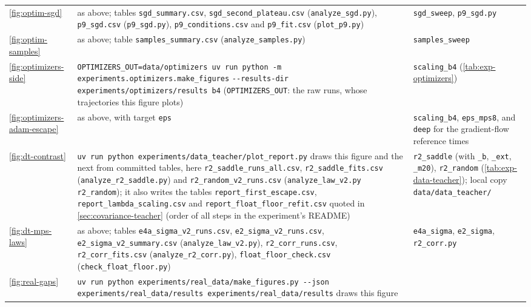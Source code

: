 \begin{xltabular}{\textwidth}{@{}l>{\raggedright\arraybackslash}p{6.4cm}>{\raggedright\arraybackslash}X@{}}
    \ref{fig:optim-sgd} & as above; tables \texttt{sgd\_summary.csv}, \texttt{sgd\_second\_plateau.csv}
      (\texttt{analyze\_sgd.py}), \texttt{p9\_sgd.csv} (\texttt{p9\_sgd.py}), \texttt{p9\_conditions.csv} and
      \texttt{p9\_fit.csv} (\texttt{plot\_p9.py})
      & \texttt{sgd\_sweep}, \texttt{p9\_sgd.py} \\
    \ref{fig:optim-samples} & as above; table \texttt{samples\_summary.csv} (\texttt{analyze\_samples.py})
      & \texttt{samples\_sweep} \\
    \ref{fig:optimizers-side} & \texttt{OPTIMIZERS\_OUT=data/optimizers uv run python -m
      experiments.optimizers.make\_figures} \texttt{-{}-results-dir experiments/optimizers/results b4}
      (\texttt{OPTIMIZERS\_OUT}: the raw runs, whose trajectories this figure plots) & \texttt{scaling\_b4}
      (\cref{tab:exp-optimizers}) \\
    \ref{fig:optimizers-adam-escape} & as above, with target \texttt{eps} & \texttt{scaling\_b4},
      \texttt{eps\_mps8}, and \texttt{deep} for the gradient-flow reference times \\
    \ref{fig:dt-contrast} & \texttt{uv run python experiments/data\_teacher/\allowbreak plot\_report.py} draws
      this figure and the next from committed tables, here \texttt{r2\_saddle\_runs\_all.csv},
      \texttt{r2\_saddle\_fits.csv} (\texttt{analyze\_r2\_saddle.py}) and \texttt{r2\_random\_v2\_runs.csv}
      (\texttt{analyze\_law\_v2.py r2\_random}); it also writes the tables \texttt{report\_first\_escape.csv},
      \texttt{report\_lambda\_scaling.csv} and \texttt{report\_float\_floor\_refit.csv} quoted in
      \cref{sec:covariance-teacher} (order of all steps in the experiment's README)
      & \texttt{r2\_saddle} (with \texttt{\_b}, \texttt{\_ext}, \texttt{\_m20}), \texttt{r2\_random}
      (\cref{tab:exp-data-teacher}); local copy \texttt{data/data\_teacher/} \\
    \ref{fig:dt-mps-laws} & as above; tables \texttt{e4a\_sigma\_v2\_runs.csv}, \texttt{e2\_sigma\_v2\_runs.csv},
      \texttt{e2\_sigma\_v2\_summary.csv} (\texttt{analyze\_law\_v2.py}), \texttt{r2\_corr\_runs.csv},
      \texttt{r2\_corr\_fits.csv} (\texttt{analyze\_r2\_corr.py}), \texttt{float\_floor\_check.csv}
      (\texttt{check\_float\_floor.py})
      & \texttt{e4a\_sigma}, \texttt{e2\_sigma}, \texttt{r2\_corr.py} \\
    \ref{fig:real-gaps} & \texttt{uv run python experiments/real\_data/\allowbreak make\_figures.py -{}-json
      experiments/real\_data/results experiments/real\_data/results} draws this figure

\end{xltabular}
